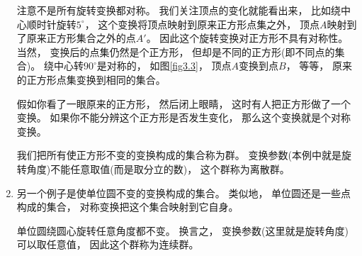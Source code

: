 \begin{enumerate}
	注意不是所有旋转变换都对称。 我们关注顶点的变化就能看出来， 比如绕中心顺时针旋转$5^\circ$， 这个变换将顶点映射到原来正方形点集之外， 顶点$A$映射到了原来正方形集合之外的点$A'$。 因此这个旋转变换对正方形不具有对称性。 当然， 变换后的点集仍然是个正方形， 但却是不同的正方形(即不同点的集合)。 绕中心转$90^\circ$是对称的， 如图\ref{fig3.3}， 顶点$A$变换到点$B$， 等等， 原来的正方形点集变换到相同的集合。
	
	{
	}
	
	假如你看了一眼原来的正方形， 然后闭上眼睛， 这时有人把正方形做了一个变换。 如果你不能分辨这个正方形是否发生变化， 那么这个变换就是个对称变换。
	
	我们把所有使正方形不变的变换构成的集合称为群。 变换参数(本例中就是旋转角度)不能任意取值(而是取分立的数)， 这个群称为离散群。
	
	\item 另一个例子是使单位圆不变的变换构成的集合。 类似地， 单位圆还是一些点构成的集合， 对称变换把这个集合映射到它自身。
	
	单位圆绕圆心旋转任意角度都不变。 换言之， 变换参数(这里就是旋转角度)可以取任意值， 因此这个群称为连续群。
\end{enumerate}
